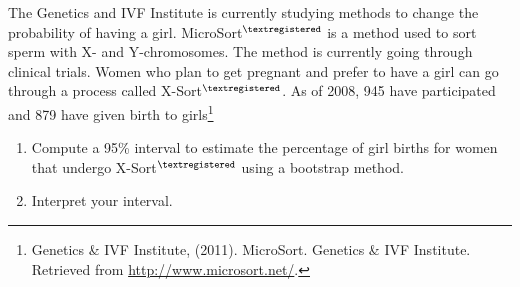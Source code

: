 \begin{enumerate}
     The Genetics and IVF Institute is currently studying methods to
     change the probability of having a
     girl. MicroSort$^{\textregistered}$ is a method used to sort
     sperm with X- and Y-chromosomes. The method is currently going
     through clinical trials. Women who plan to get pregnant and
     prefer to have a girl can go through a process called
     X-Sort$^{\textregistered}$. As of 2008, 945 have participated and
     879 have given birth to girls\footnote{Genetics \& IVF Institute,
       (2011). MicroSort. Genetics \& IVF Institute. Retrieved from
       \url{http://www.microsort.net/}. }
       \begin{enumerate}
       \item  Compute a 95\% interval to estimate the percentage of
         girl births for women that undergo X-Sort$^{\textregistered}$
         using a bootstrap method. 
\begin{students}
          \vspace{2cm}
\end{students}
\begin{key}
 {\it  }      
\end{key} 

       \item  Interpret your interval. 
\begin{students}
          \vspace{4cm}
\end{students}
\begin{key}
 {\it  }      
\end{key}


\end{enumerate}
\end{enumerate}
